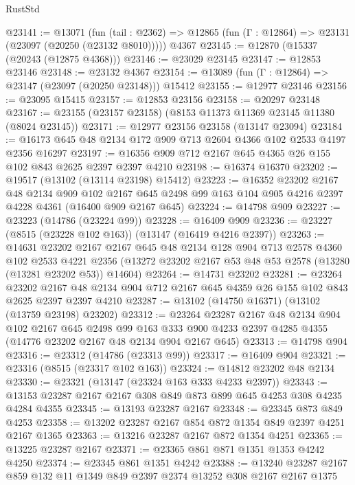 \begin{lexlean}{RustStd}
\begin{coremodule}
@23141 := @13071
    (fun (tail : @2362) => @12865 (fun (Γ : @12864) => @23131 (@23097 (@20250 (@23132 @8010)))))
    @4367
@23145 := @12870 (@15337 (@20243 (@12875 @4368)))
@23146 := @23029 @23145
@23147 := @12853 @23146
@23148 := @23132 @4367
@23154 := @13089 (fun (Γ : @12864) => @23147 (@23097 (@20250 @23148))) @15412
@23155 := @12977 @23146
@23156 := @23095 @15415
@23157 := @12853 @23156
@23158 := @20297 @23148
@23167 := @23155 (@23157 @23158) (@8153 @11373 @11369 @23145 @11380 (@8024 @23145))
@23171 := @12977 @23156 @23158 (@13147 @23094)
@23184 := @16173 @645 @48 @2134 @172 @909 @713 @2604 @4366 @102 @2533 @4197 @2356 @16297
@23197 := @16356 @909 @712 @2167 @645 @4365 @26 @155 @102 @843 @2625 @2397 @2397 @4210
@23198 := @16374 @16370
@23202 := @19517 (@13102 (@13114 @23198) @15412)
@23223 := @16352
    @23202
    @2167
    @48
    @2134
    @909
    @102
    @2167
    @645
    @2498
    @99
    @163
    @104
    @905
    @4216
    @2397
    @4228
    @4361
    (@16400 @909 @2167 @645)
@23224 := @14798 @909
@23227 := @23223 (@14786 (@23224 @99))
@23228 := @16409 @909
@23236 := @23227 (@8515 (@23228 @102 @163)) (@13147 (@16419 @4216 @2397))
@23263 := @14631
    @23202
    @2167
    @2167
    @645
    @48
    @2134
    @128
    @904
    @713
    @2578
    @4360
    @102
    @2533
    @4221
    @2356
    (@13272 @23202 @2167 @53 @48 @53 @2578 (@13280 (@13281 @23202 @53)) @14604)
@23264 := @14731 @23202
@23281 := @23264
    @23202
    @2167
    @48
    @2134
    @904
    @712
    @2167
    @645
    @4359
    @26
    @155
    @102
    @843
    @2625
    @2397
    @2397
    @4210
@23287 := @13102 (@14750 @16371) (@13102 (@13759 @23198) @23202)
@23312 := @23264
    @23287
    @2167
    @48
    @2134
    @904
    @102
    @2167
    @645
    @2498
    @99
    @163
    @333
    @900
    @4233
    @2397
    @4285
    @4355
    (@14776 @23202 @2167 @48 @2134 @904 @2167 @645)
@23313 := @14798 @904
@23316 := @23312 (@14786 (@23313 @99))
@23317 := @16409 @904
@23321 := @23316 (@8515 (@23317 @102 @163))
@23324 := @14812 @23202 @48 @2134
@23330 := @23321 (@13147 (@23324 @163 @333 @4233 @2397))
@23343 := @13153 @23287 @2167 @2167 @308 @849 @873 @899 @645 @4253 @308 @4235 @4284 @4355
@23345 := @13193 @23287 @2167
@23348 := @23345 @873 @849 @4253
@23358 := @13202 @23287 @2167 @854 @872 @1354 @849 @2397 @4251 @2167 @1365
@23363 := @13216 @23287 @2167 @872 @1354 @4251
@23365 := @13225 @23287 @2167
@23371 := @23365 @861 @871 @1351 @1353 @4242 @4250
@23374 := @23345 @861 @1351 @4242
@23388 := @13240 @23287 @2167 @859 @132 @11 @1349 @849 @2397 @2374 @13252 @308 @2167 @2167 @1375

\end{coremodule}
\end{lexlean}
